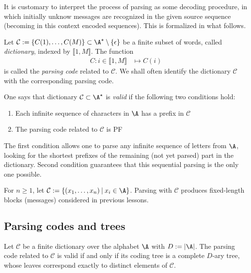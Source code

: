 \documentclass[toc, titlepaged]{../cs-classes/cs-classes}
\begin{document}
It is customary to interpret the process of parsing as some decoding procedure, in which initially unknow messages are recognized in the given source sequence (becoming in this  context encoded sequences). This is formalized in what follows.

\begin{definition}
    Let $\mathcal{C} := \{C(1), \dots, C(M)\} \subset \A^\star\setminus\{\epsilon\}$ be a finite subset of words, called \emph{dictionary}, indexed by $\llbracket 1, M\rrbracket$. The function
    \begin{equation*}
        \begin{aligned}
            C : i\in \llbracket 1, M\rrbracket &\mapsto C(i)
        \end{aligned}
    \end{equation*}
    is called the \emph{parsing code} related to $\mathcal{C}$. We shall often identify the dictionary $\mathcal{C}$ with the corresponding parsing code.
\end{definition}

\begin{definition}
    One says that dictionary $\mathcal{C} \subset \A^\star$ is \emph{valid} if the following two conditions hold:
    \begin{enumerate}
        \item Each infinite sequence of characters in $\A$ has a prefix in $\mathcal{C}$
        \item The parsing code related to $\mathcal{C}$ is PF
    \end{enumerate}
\end{definition}
The first condition allows one to parse any infinite sequence of letters from $\A$, looking for the shortest prefixes of the remaining (not yet parsed) part in the dictionary. Second condition guarantees that this sequential parsing is the only one possible.

\begin{example}
    For $n\geq1$, let $\mathcal{C} := \{(x_1, \dots, x_n) \: | \: x_i \in \A\}$. Parsing with $\mathcal{C}$ produces fixed-length blocks (messages) considered in previous lessons.
\end{example}

\subsection{Parsing codes and trees}
\begin{lemma}
    Let $\mathcal{C}$ be a finite dictionary over the alphabet $\A$ with $D:=|\A|$. The parsing code related to $\mathcal{C}$ is valid if and only if its coding tree is a complete $D$-ary tree, whose leaves correspond exactly to distinct elements of $\mathcal{C}$.
\end{lemma}
\end{document}
